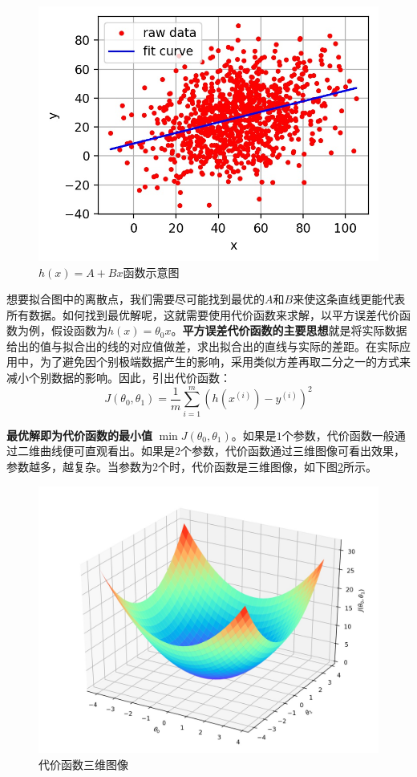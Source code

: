  \begin{figure}[h]
   \centering
   \includegraphics[width=.7\textwidth]{ch02/img/ch2/2.16/1.jpg}
   \caption{$h(x) = A + Bx$函数示意图}
   \label{fig:2.4}
 \end{figure}

想要拟合图中的离散点，我们需要尽可能找到最优的$A$和$B$来使这条直线更能代表所有数据。如何找到最优解呢，这就需要使用代价函数来求解，以平方误差代价函数为例，假设函数为$h(x)=\theta_0x$。{\bf 平方误差代价函数的主要思想}就是将实际数据给出的值与拟合出的线的对应值做差，求出拟合出的直线与实际的差距。在实际应用中，为了避免因个别极端数据产生的影响，采用类似方差再取二分之一的方式来减小个别数据的影响。因此，引出代价函数：
$$
J(\theta_0, \theta_1) = \frac{1}{m}\sum_{i=1}^m(h(x^{(i)})-y^{(i)})^2
$$

{\bf 最优解即为代价函数的最小值} $\min J(\theta_0, \theta_1)$。如果是$1$个参数，代价函数一般通过二维曲线便可直观看出。如果是$2$个参数，代价函数通过三维图像可看出效果，参数越多，越复杂。当参数为$2$个时，代价函数是三维图像，如下图\ref{fig:2.5}所示。

 \begin{figure}[h]
   \centering
   \includegraphics[width=.7\textwidth]{ch02/img/ch2/2.16/2.jpg}
   \caption{代价函数三维图像}
   \label{fig:2.5}
 \end{figure}

